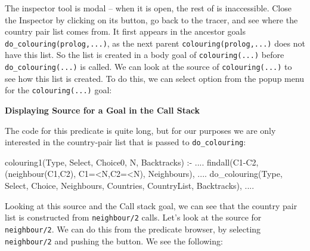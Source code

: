 \begin{sloppypar}
The inspector tool is modal -- when it is open, the rest of {\tkeclipse} is
inaccessible. Close the Inspector by clicking on its
 button, go back to the tracer, and see where the country
pair list comes from. It
first appears in 
the ancestor goals \verb'do_colouring(prolog,...)', as the next parent
\verb'colouring(prolog,...)' does not have this list. So the list
is created in a body goal of \verb'colouring(...)' before \verb'do_colouring(...)' is
called. We can look at the source of \verb'colouring(...)'  to see how this
list is created. To do this, we can
select  option from the popup menu for the
\verb'colouring(...)' goal:
\end{sloppypar}
 
\begin{center}

\vspace{3mm}
{\bf Displaying Source for a Goal in the Call Stack}
\end{center}

The code for this predicate is quite long, but for our purposes we are only
interested in the country-pair list that is passed to \verb'do_colouring':

\begin{code}
colouring1(Type, Select, Choice0, N, Backtracks) :-
        ....
        findall(C1-C2, (neighbour(C1,C2), C1=<N,C2=<N), Neighbours),
        ....
        do_colouring(Type, Select, Choice, Neighbours, Countries,
                     CountryList, Backtracks), 
        ....
\end{code}

Looking at this source and the Call stack goal, we can see that the country
pair list is constructed from \verb'neighbour/2' calls. Let's look at the
source for \verb'neighbour/2'. We can do this from the predicate browser, by
selecting \verb'neighbour/2' and pushing the  button. We see
the following:

